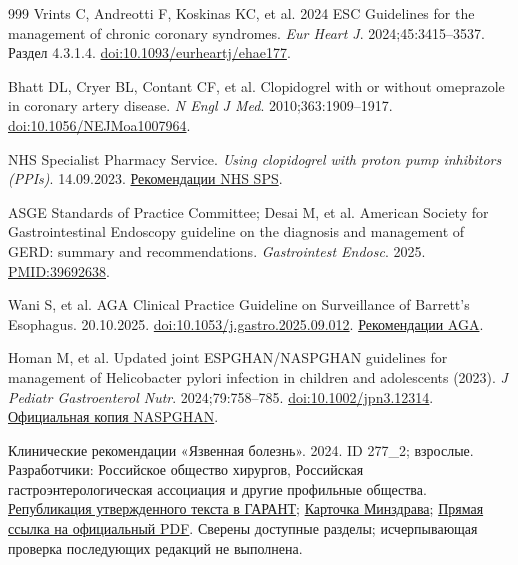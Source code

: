 \documentclass[11pt,a4paper,notitlepage]{report}
\begin{document}
\begin{thebibliography}{999}
 Vrints C, Andreotti F, Koskinas KC, et al. 2024 ESC Guidelines for the management of chronic coronary syndromes. \textit{Eur Heart J}. 2024;45:3415--3537. Раздел 4.3.1.4. \href{https://doi.org/10.1093/eurheartj/ehae177}{doi:10.1093/eurheartj/ehae177}.

 Bhatt DL, Cryer BL, Contant CF, et al. Clopidogrel with or without omeprazole in coronary artery disease. \textit{N Engl J Med}. 2010;363:1909--1917. \href{https://doi.org/10.1056/NEJMoa1007964}{doi:10.1056/NEJMoa1007964}.

 NHS Specialist Pharmacy Service. \textit{Using clopidogrel with proton pump inhibitors (PPIs)}. 14.09.2023. \href{https://www.sps.nhs.uk/articles/using-clopidogrel-with-proton-pump-inhibitors-ppis/}{Рекомендации NHS SPS}.

 ASGE Standards of Practice Committee; Desai M, et al. American Society for Gastrointestinal Endoscopy guideline on the diagnosis and management of GERD: summary and recommendations. \textit{Gastrointest Endosc}. 2025. \href{https://pubmed.ncbi.nlm.nih.gov/39692638/}{PMID:39692638}.

 Wani S, et al. AGA Clinical Practice Guideline on Surveillance of Barrett's Esophagus. 20.10.2025. \href{https://doi.org/10.1053/j.gastro.2025.09.012}{doi:10.1053/j.gastro.2025.09.012}. \href{https://gastro.org/clinical-guidance/surveillance-of-barretts-esophagus/}{Рекомендации AGA}.

 Homan M, et al. Updated joint ESPGHAN/NASPGHAN guidelines for management of Helicobacter pylori infection in children and adolescents (2023). \textit{J Pediatr Gastroenterol Nutr}. 2024;79:758--785. \href{https://doi.org/10.1002/jpn3.12314}{doi:10.1002/jpn3.12314}. \href{https://naspghan.org/wp-content/uploads/2024/10/J-pediatr-gastroenterol-nutr-2024-Homan-Updated-joint-ESPGHAN-NASPGHAN-guidelines-for-management-of-Helicobacter.pdf}{Официальная копия NASPGHAN}.

 Клинические рекомендации «Язвенная болезнь». 2024. ID 277\_2; взрослые. Разработчики: Российское общество хирургов, Российская гастроэнтерологическая ассоциация и другие профильные общества. \href{https://base.garant.ru/411274125/}{Републикация утвержденного текста в ГАРАНТ}; \href{https://cr.minzdrav.gov.ru/view-cr/277_2}{Карточка Минздрава}; \href{https://apicr.minzdrav.gov.ru/api.ashx?id=277_2&op=GetClinrecPdf}{Прямая ссылка на официальный PDF}. Сверены доступные разделы; исчерпывающая проверка последующих редакций не выполнена.


\end{thebibliography}
\end{document}
